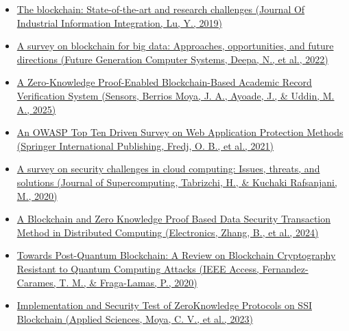 \documentclass[conference]{IEEEtran}
\begin{document}
\begin{itemize}

    \item 
    \href{https://doi.org/10.1016/j.jii.2019.04.002}{The blockchain: State-of-the-art and research challenges (Journal Of Industrial Information Integration, Lu, Y., 2019)}

    \item 
    \href{https://doi.org/10.1016/j.future.2022.01.017}{A survey on blockchain for big data: Approaches, opportunities, and future directions (Future Generation Computer Systems, Deepa, N., et al., 2022)}

    \item \begin{otherlanguage}{english}
    \href{https://doi.org/10.3390/s25113450}{A Zero-Knowledge Proof-Enabled Blockchain-Based Academic Record Verification System (Sensors, Berrios Moya, J. A., Ayoade, J., \& Uddin, M. A., 2025)}
    \end{otherlanguage}
    \item 
    \href{https://doi.org/10.1007/978-3-030-68887-5_14}{An OWASP Top Ten Driven Survey on Web Application Protection Methods (Springer International Publishing, Fredj, O. B., et al., 2021)}

    \item 
    \href{https://doi.org/10.1007/s11227-020-03213-1}{A survey on security challenges in cloud computing: Issues, threats, and solutions (Journal of Supercomputing, Tabrizchi, H., \& Kuchaki Rafsanjani, M., 2020)}

    \item 
    \href{https://doi.org/10.3390/electronics13214260}{A Blockchain and Zero Knowledge Proof Based Data Security Transaction Method in Distributed Computing (Electronics, Zhang, B., et al., 2024)}
    \item 
    \href{https://doi.org/10.1109/access.2020.2968985}{Towards Post-Quantum Blockchain: A Review on Blockchain Cryptography Resistant to Quantum Computing Attacks (IEEE Access, Fernandez-Carames, T. M., \& Fraga-Lamas, P., 2020)}
    \item 
    \href{https://doi.org/10.3390/app13095552}{Implemen\-tation and Security Test of Zero\-Knowledge Proto\-cols on SSI Block\-chain (Applied Sciences, Moya, C. V., et al., 2023)}

\end{itemize}
\end{document}
